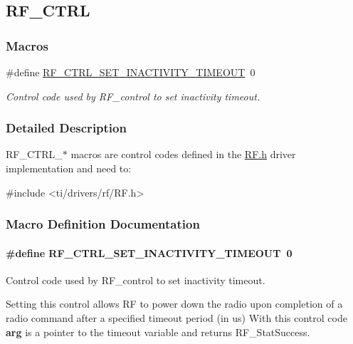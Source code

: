 \subsection{R\+F\+\_\+\+C\+T\+R\+L}
\label{group___r_f___c_t_r_l}
\subsubsection*{Macros}
\begin{DoxyCompactItemize}
\item 
\#define \hyperlink{group___r_f___c_t_r_l_ga24096530a8da4bde84275bc9c76b2cee}{R\+F\+\_\+\+C\+T\+R\+L\+\_\+\+S\+E\+T\+\_\+\+I\+N\+A\+C\+T\+I\+V\+I\+T\+Y\+\_\+\+T\+I\+M\+E\+O\+U\+T}~0
\begin{DoxyCompactList}\small\item\em Control code used by R\+F\+\_\+control to set inactivity timeout. \end{DoxyCompactList}\end{DoxyCompactItemize}


\subsubsection{Detailed Description}
R\+F\+\_\+\+C\+T\+R\+L\+\_\+$\ast$ macros are control codes defined in the \hyperlink{_r_f_8h}{R\+F.\+h} driver implementation and need to\+: 
\begin{DoxyCode}
\textcolor{preprocessor}{#include <ti/drivers/rf/RF.h>}
\end{DoxyCode}
 

\subsubsection{Macro Definition Documentation}
\paragraph[{R\+F\+\_\+\+C\+T\+R\+L\+\_\+\+S\+E\+T\+\_\+\+I\+N\+A\+C\+T\+I\+V\+I\+T\+Y\+\_\+\+T\+I\+M\+E\+O\+U\+T}]{\setlength{\rightskip}{0pt plus 5cm}\#define R\+F\+\_\+\+C\+T\+R\+L\+\_\+\+S\+E\+T\+\_\+\+I\+N\+A\+C\+T\+I\+V\+I\+T\+Y\+\_\+\+T\+I\+M\+E\+O\+U\+T~0}\label{group___r_f___c_t_r_l_ga24096530a8da4bde84275bc9c76b2cee}


Control code used by R\+F\+\_\+control to set inactivity timeout. 

Setting this control allows R\+F to power down the radio upon completion of a radio command after a specified timeout period (in us) With this control code {\bfseries arg} is a pointer to the timeout variable and returns R\+F\+\_\+\+Stat\+Success. 